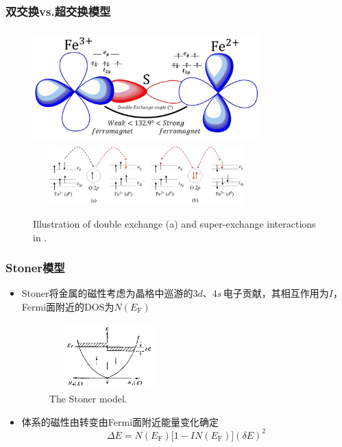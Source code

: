\frame
{
	\frametitle{双交换\textrm{vs.}超交换模型}
\begin{figure}[h!]
	\vspace{-0.15in}
\centering
\includegraphics[height=1.70in,width=3.45in,viewport=0 0 1500 700,clip]{Figures/Double-exchange-model.jpg}
\includegraphics[height=0.90in,width=3.45in,viewport=0 0 640 200,clip]{Figures/Illustration-of-double-exchange-and-superexchange-interactions-in-Fe-3-O-4.jpg}
\caption{\tiny \textrm{Illustration of double exchange (a) and super-exchange interactions in .}}%
\label{double-super-exchange-2}
\end{figure}
}

\frame
{
	\frametitle{\textrm{Stoner}模型}
	\begin{itemize}
		\item \textrm{Stoner}将金属的磁性考虑为晶格中巡游的$3d$、$4s$\,电子贡献，其相互作用为$I$，\textrm{Fermi}面附近的\textrm{DOS}为$N(E_{\mathrm F})$
\begin{figure}[h!]
\centering
\vspace*{-0.05in}
\includegraphics[height=1.0in,width=1.8in,viewport=0 0 800 380,clip]{Figures/Mag_Metal-T0.png}
\caption{\tiny \textrm{The Stoner model.}}%
\label{Mag_Metal-T0}
\end{figure}
		\item 体系的磁性由转变由\textrm{Fermi}面附近能量变化确定
			\begin{displaymath}
				\Delta E=N(E_{\mathrm F})\big[1-IN(E_{\mathrm F})\big](\delta E)^2
			\end{displaymath}
	\end{itemize}
}

